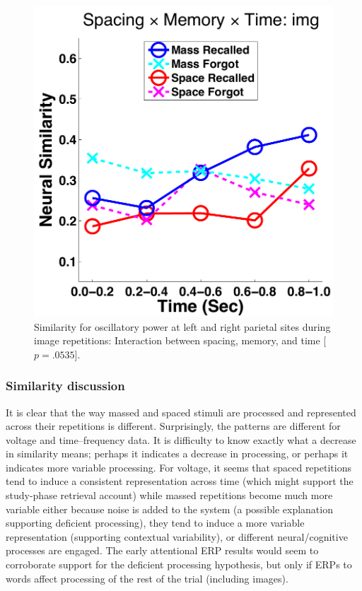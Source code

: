 \begin{figure}
  \centering
  \includegraphics[width=.40\textwidth]{./figs/exp1/similarity_spacXmemXtime_img_pow_LPSRPS_0to200_200to400_400to600_600to800_800to1000_kaiser_cosine}
  \caption{Similarity for oscillatory power at left and right parietal sites during image repetitions: Interaction between spacing, memory, and time [$p=.0535$].}
  \label{fig:sim_pow_spacXmemXtime}
\end{figure}

\subsubsection{Similarity discussion}

It is clear that the way massed and spaced stimuli are processed and represented across their repetitions is different.  Surprisingly, the patterns are different for voltage and time--frequency data.  It is difficulty to know exactly what a decrease in similarity means; perhaps it indicates a decrease in processing, or perhaps it indicates more variable processing.  For voltage, it seems that spaced repetitions tend to induce a consistent representation across time (which might support the study-phase retrieval account) while massed repetitions become much more variable either because noise is added to the system (a possible explanation supporting deficient processing), they tend to induce a more variable representation (supporting contextual variability), or different neural/cognitive processes are engaged.
The early attentional ERP results would seem to corroborate support for the deficient processing hypothesis, but only if ERPs to words affect processing of the rest of the trial (including images).

